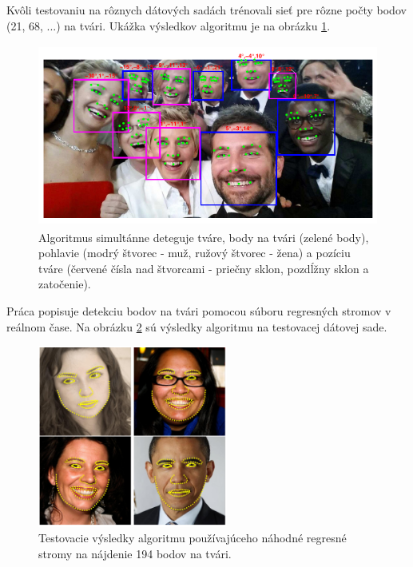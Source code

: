Kvôli testovaniu na rôznych dátových sadách trénovali sieť pre rôzne počty bodov (21, 68, ...) na tvári. 
Ukážka výsledkov algoritmu je na obrázku \ref{pic-pic-ranjan2017hyperface-xichty.png}.

\begin{figure}[H]
	\begin{center}
		\includegraphics[height=6cm]{pics/pic-ranjan2017hyperface-xichty.png}
		\caption{Algoritmus simultánne deteguje tváre, body na tvári (zelené body), pohlavie (modrý štvorec - muž, ružový štvorec - žena) a pozíciu tváre (červené čísla nad štvorcami - priečny sklon, pozdĺžny sklon a zatočenie).  
		 \cite{ranjan2017hyperface}}
		\label{pic-pic-ranjan2017hyperface-xichty.png}
	\end{center}
\end{figure}

Práca \cite{kazemi2014one} popisuje detekciu bodov na tvári pomocou súboru regresných stromov v reálnom čase. 
Na obrázku \ref{pic-oneMsBody.png} sú výsledky algoritmu na testovacej dátovej sade.

\begin{figure}[H]
	\begin{center}
		\includegraphics[height=6cm]{pics/oneMsBody.png}
		\caption{Testovacie výsledky algoritmu používajúceho náhodné regresné stromy na nájdenie 194 bodov na tvári. 
		 \cite{kazemi2014one}}
		\label{pic-oneMsBody.png}
	\end{center}
\end{figure}

